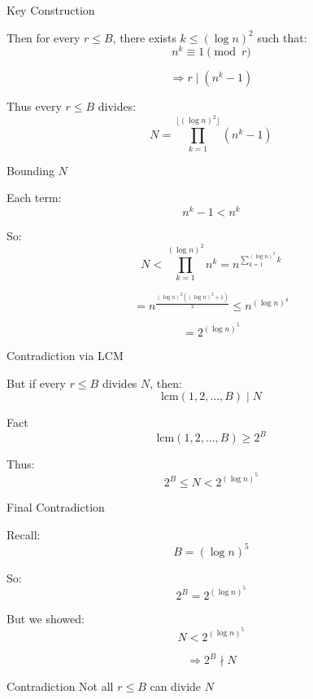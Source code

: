 \documentclass{beamer}
\begin{document}

\begin{frame}{Key Construction}

Then for every $r \le B$, there exists $k \le (\log n)^2$ such that:
\[
n^k \equiv 1 \pmod{r}
\]

\[
\Rightarrow r \mid (n^k - 1)
\]


Thus every $r \le B$ divides:
\[
N = \prod_{k=1}^{\lfloor (\log n)^2 \rfloor} (n^k - 1)
\]

\end{frame}


\begin{frame}{Bounding $N$}

Each term:
\[
n^k - 1 < n^k
\]

So:
\[
N < \prod_{k=1}^{(\log n)^2} n^k = n^{\sum_{k=1}^{(\log n)^2} k}
\]

\[
= n^{\frac{(\log n)^2((\log n)^2 + 1)}{2}} \le n^{(\log n)^4}
\]

\[
= 2^{(\log n)^5}
\]

\end{frame}


\begin{frame}{Contradiction via LCM}

But if every $r \le B$ divides $N$, then:
\[
\mathrm{lcm}(1,2,\dots,B) \mid N
\]


\begin{block}{Fact}
\[
\mathrm{lcm}(1,2,\dots,B) \ge 2^B
\]
\end{block}


Thus:
\[
2^B \le N < 2^{(\log n)^5}
\]

\end{frame}


\begin{frame}{Final Contradiction}

Recall:
\[
B = (\log n)^5
\]

So:
\[
2^B = 2^{(\log n)^5}
\]

But we showed:
\[
N < 2^{(\log n)^5}
\]


\[
\Rightarrow 2^B \nmid N
\]


\begin{block}{Contradiction}
Not all $r \le B$ can divide $N$
\end{block}

\end{frame}
\end{document}

